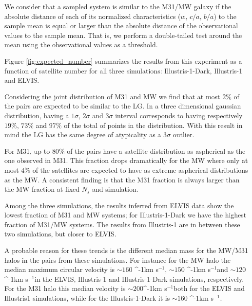 \documentclass[a4paper,fleqn,usenatbib]{mnras}
\newcommand{\kms}{\ifmmode\mathrm{km\ s}^{-1}\else km s$^{-1}$\fi}
\begin{document}
We consider that a sampled system is similar to the M31/MW galaxy if the
absolute distance of each of its normalized characteristics ($w$, $c/a$, $b/a$) to the
sample mean is equal or larger than the absolute distance of the observational
values to the sample mean.   
That is, we perform a double-tailed test around the mean using the
observational values as a threshold.  

Figure \ref{fig:expected_number} summarizes the results from this
experiment as a function of satellite number for all three simulations:
Illustris-1-Dark, Illustris-1 and ELVIS.

Considering the joint distribution of M31 and MW we find that at most
$2\%$ of the pairs are expected to be similar to the LG.
In a three dimensional gaussian distribution, having a $1\sigma$,
$2\sigma$ and $3\sigma$ interval corresponds to having respectively $19 \%$, $73 \%$ and
$97 \%$ of the total of points in the distribution.
With this result in mind the LG has the same degree of atypicality
as a $3\sigma$ outlier. 

For M31, up to $80\%$ of the pairs have a satellite
distribution as aspherical as the one observed in M31.
This fraction drops
dramatically for the MW where only at most $4\%$ of the satellites
are expected to have as extreme aspherical distributions as the MW.
A consistent finding is that the M31 fraction is always larger than
the MW fraction at fixed $N_s$ and simulation.

Among the three simulations, the results inferred from ELVIS data show
the lowest fraction of M31 and MW systems; for Illustris-1-Dark we have
the highest fraction of M31/MW systems. 
The results from Illustris-1 are in between these two simulations, but
closer to ELVIS. 

A probable reason for these trends is the different median mass
for the MW/M31 halos in the pairs from these simulations. 
For instance for the MW halo the median maximum circular velocity is
$\sim 160$ \kms, $\sim 150$ \kms and $\sim 120$ \kms in the ELVIS,
Illustris-1 and Illustris-1-Dark simulations, respectively.
For the M31 halo this median velocity is $\sim 200$\kms both for the
ELVIS and Illustris1 simulations, while for the Illustris-1-Dark it is
$\sim 160$ \kms. 
\end{document}
